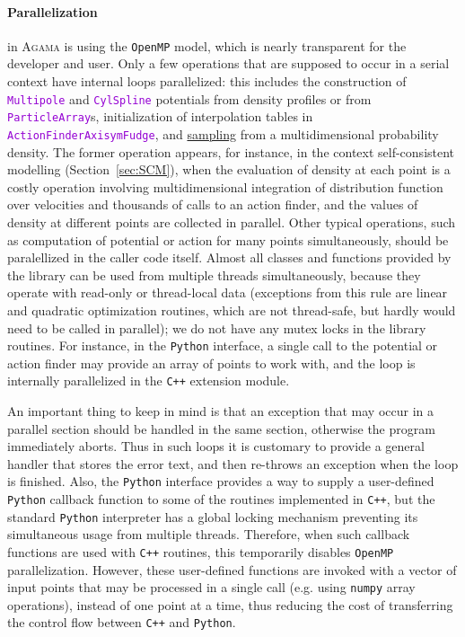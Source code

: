 \documentclass[12pt]{article}
\newcommand{\Agama}{\textsc{Agama}\xspace}
\newcommand{\Cpp}  {\texttt{C++}\xspace}
\newcommand{\Python}{\texttt{Python}\xspace}
\newcommand{\ttt}[1]{\textcolor{darkviolet}{\texttt{#1}}}
\begin{document}
\paragraph{Parallelization}  in \Agama is using the \texttt{OpenMP} model, which is nearly transparent for the developer and user. Only a few operations that are supposed to occur in a serial context have internal loops parallelized: this includes the construction of \ttt{Multipole} and \ttt{CylSpline} potentials from density profiles or from \ttt{ParticleArray}s, initialization of interpolation tables in \ttt{ActionFinderAxisymFudge}, and \hyperref[sec:Sampling]{sampling} from a multidimensional probability density. The former operation appears, for instance, in the context self-consistent modelling (Section~\ref{sec:SCM}), when the evaluation of density at each point is a costly operation involving multidimensional integration of distribution function over velocities and thousands of calls to an action finder, and the values of density at different points are collected in parallel.
Other typical operations, such as computation of potential or action for many points simultaneously, should be paralellized in the caller code itself. Almost all classes and functions provided by the library can be used from multiple threads simultaneously, because they operate with read-only or thread-local data (exceptions from this rule are linear and quadratic optimization routines, which are not thread-safe, but hardly would need to be called in parallel); we do not have any mutex locks in the library routines.
For instance, in the \Python interface, a single call to the potential or action finder may provide an array of points to work with, and the loop is internally parallelized in the \Cpp extension module. 

An important thing to keep in mind is that an exception that may occur in a parallel section should be handled in the same section, otherwise the program immediately aborts. Thus in such loops it is customary to provide a general handler that stores the error text, and then re-throws an exception when the loop is finished.
Also, the \Python interface provides a way to supply a user-defined \Python callback function to some of the routines implemented in \Cpp, but the standard \Python interpreter has a global locking mechanism preventing its simultaneous usage from multiple threads. Therefore, when such callback functions are used with \Cpp routines, this temporarily disables \texttt{OpenMP} parallelization. However, these user-defined functions are invoked with a vector of input points that may be processed in a single call (e.g. using \texttt{numpy} array operations), instead of one point at a time, thus reducing the cost of transferring the control flow between \Cpp and \Python.
\end{document}
